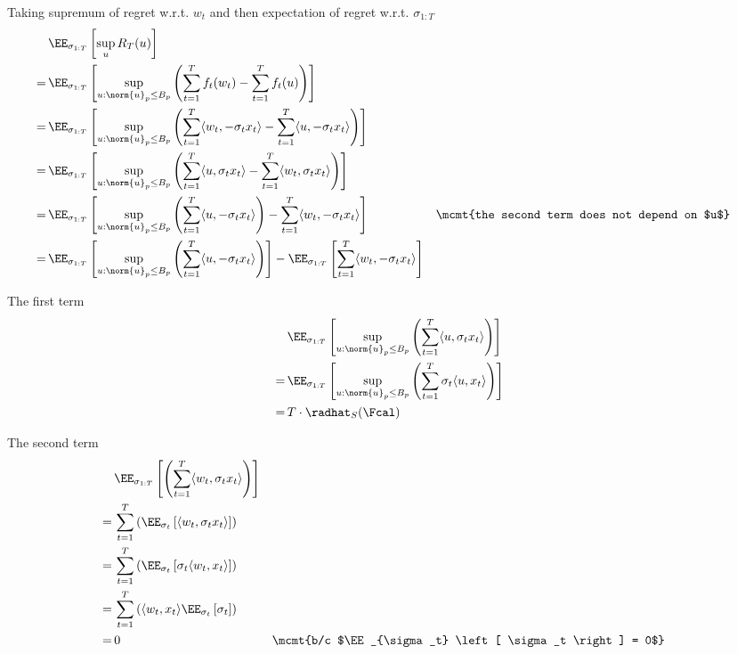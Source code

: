 Taking supremum of regret w.r.t. $w_t$ and then expectation of regret w.r.t. $\sigma_{1:T}$
\begin{align*}
  &\displaystyle \EE_{\sigma_{1:T}}\left[ \sup_u R_T(u) \right] \\
  =\,& \EE_{\sigma_{1:T}} \left[ \sup_{u: \norm{u}_p \le B_p} \left( \sum_{t=1}^Tf_t(w_t) - \sum_{t=1}^T f_t(u) \right) \right]  \\
  =\,& \EE_{\sigma_{1:T}} \left[ \sup_{u: \norm{u}_p \le B_p} \left( \sum_{t=1}^T\langle w_t, -\sigma_t x_t \rangle - \sum_{t=1}^T \langle u, -\sigma_t x_t \rangle \right) \right]  \\
  =\,& \EE_{\sigma_{1:T}} \left[ \sup_{u: \norm{u}_p \le B_p} \left( \sum_{t=1}^T \langle u, \sigma_t x_t \rangle - \sum_{t=1}^T\langle w_t, \sigma_t x_t \rangle \right) \right]  \\
  =\,& \EE_{\sigma_{1:T}} \left[ \sup_{u: \norm{u}_p \le B_p} \left(\sum_{t=1}^T \langle u, -\sigma_t x_t \rangle \right) - \sum_{t=1}^T\langle w_t, -\sigma_t x_t \rangle \right]  && \mcmt{the second term does not depend on $u$} \\
  =\,& \EE_{\sigma_{1:T}} \left[ \sup_{u: \norm{u}_p \le B_p} \left(\sum_{t=1}^T \langle u, -\sigma_t x_t \rangle \right) \right] - \EE_{\sigma_{1:T}} \left[ \sum_{t=1}^T\langle w_t, -\sigma_t x_t \rangle \right]  \\
\end{align*}

The first term
\begin{align*}
  &\EE_{\sigma_{1:T}} \left[ \sup_{u: \norm{u}_p \le B_p} \left( \sum_{t=1}^T \langle u, \sigma_t x_t \rangle \right) \right] \\
  =\,&\EE_{\sigma_{1:T}} \left[ \sup_{u: \norm{u}_p \le B_p} \left( \sum_{t=1}^T \sigma_t \langle u,  x_t \rangle \right) \right] \\
  =\,&T \cdot \radhat_S(\Fcal)
\end{align*}

The second term
\begin{align*}
  &\EE_{\sigma_{1:T}} \left[\left( \sum_{t=1}^T \langle w_t, \sigma_t x_t \rangle \right) \right] \\
  =\,&\sum_{t=1}^T \left( \EE_{\sigma_t} \left[ \langle w_t, \sigma_t x_t \rangle \right] \right)  \\
  =\,&\sum_{t=1}^T \left( \EE_{\sigma_t} \left[ \sigma_t \langle w_t, x_t \rangle \right] \right)  \\
  =\,&\sum_{t=1}^T \left( \langle w_t, x_t \rangle \EE_{\sigma_t} \left[ \sigma_t \right] \right)  \\
  =\,& 0 && \mcmt{b/c $\EE_{\sigma_t} \left[ \sigma_t \right] = 0$}
\end{align*}

